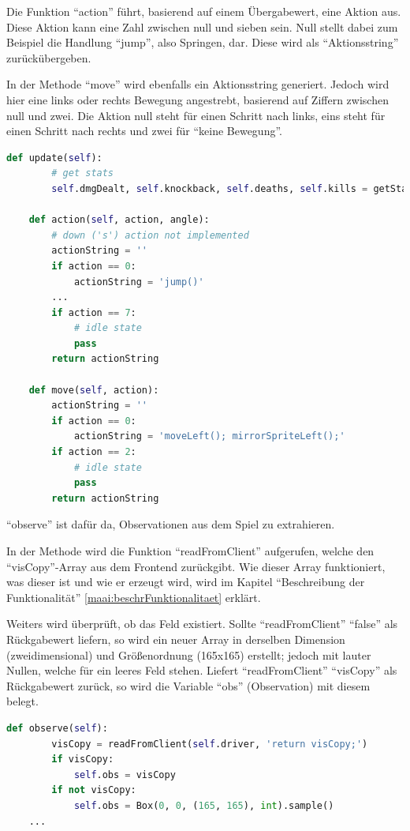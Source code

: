 Die Funktion ``action'' führt, basierend auf einem Übergabewert, eine Aktion aus. Diese Aktion kann eine Zahl zwischen null und sieben sein. Null stellt dabei zum Beispiel die Handlung ``jump'', also Springen, dar. Diese wird als ``Aktionsstring'' zurückübergeben.

In der Methode ``move'' wird ebenfalls ein Aktionsstring generiert. Jedoch wird hier eine links oder rechts Bewegung angestrebt, basierend auf Ziffern zwischen null und zwei. Die Aktion null steht für einen Schritt nach links, eins steht für einen Schritt nach rechts und zwei für ``keine Bewegung''.


\begin{lstlisting}[language=Python,firstnumber=56]
    def update(self):
        # get stats
        self.dmgDealt, self.knockback, self.deaths, self.kills = getStats(self.driver)

    def action(self, action, angle):
        # down ('s') action not implemented
        actionString = ''
        if action == 0:
            actionString = 'jump()'
        ...
        if action == 7:
            # idle state
            pass
        return actionString

    def move(self, action):
        actionString = ''
        if action == 0:
            actionString = 'moveLeft(); mirrorSpriteLeft();'
        if action == 2:
            # idle state
            pass
        return actionString
\end{lstlisting}


``observe'' ist dafür da, Observationen aus dem Spiel zu extrahieren.

In der Methode wird die Funktion ``readFromClient'' aufgerufen, welche den ``visCopy''-Array aus dem Frontend zurückgibt. Wie dieser Array funktioniert, was dieser ist und wie er erzeugt wird, wird im Kapitel ``Beschreibung der Funktionalität'' \ref{maai:beschrFunktionalitaet} erklärt.

Weiters wird überprüft, ob das Feld existiert. Sollte ``readFromClient'' ``false'' als Rückgabewert liefern, so wird ein neuer Array in derselben Dimension (zweidimensional) und Größenordnung (165x165) erstellt; jedoch mit lauter Nullen, welche für ein leeres Feld stehen. Liefert ``readFromClient'' ``visCopy'' als Rückgabewert zurück, so wird die Variable ``obs'' (Observation) mit diesem belegt.



\begin{lstlisting}[language=Python,firstnumber=78]
    def observe(self):
        visCopy = readFromClient(self.driver, 'return visCopy;')
        if visCopy:
            self.obs = visCopy
        if not visCopy:
            self.obs = Box(0, 0, (165, 165), int).sample()
    ...
\end{lstlisting}


